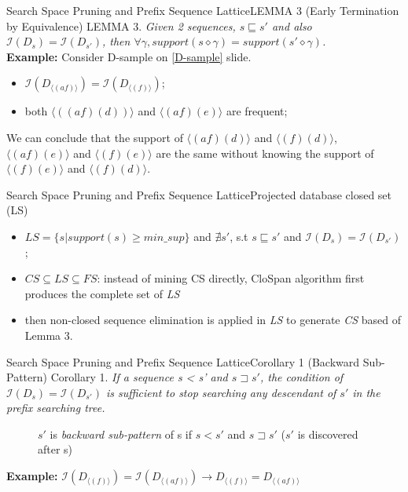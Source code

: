 \documentclass[12pt]{beamer}
\newcommand{\splitline}{\vspace{0.4cm}}
\begin{document}
\begin{frame}{Search Space Pruning and Prefix Sequence Lattice}{LEMMA 3 (Early Termination by Equivalence)}
LEMMA 3. {\it Given 2 sequences, $s \sqsubseteq s'$ and also $\mathcal{I}(D_s) = \mathcal{I}(D_{s'})$, then $\forall\gamma, support(s \diamond \gamma) = support(s' \diamond \gamma)$.}\\
\splitline
{\bf Example:} Consider D-sample on \ref{D-sample} slide.
\begin{itemize}
\item $\mathcal{I}(D_{\langle (af) \rangle}) = \mathcal{I}(D_{\langle (f) \rangle})$;
\item both $\langle ((af)(d)) \rangle$ and $\langle (af)(e) \rangle$ are frequent;
\end{itemize}
We can conclude that the support of $\langle (af)(d) \rangle$ and $\langle (f)(d) \rangle$, $\langle (af)(e) \rangle$ and $\langle (f)(e) \rangle$ are the same without knowing the support of $\langle (f)(e) \rangle$ and $\langle (f)(d) \rangle$.
\end{frame}

\begin{frame}{Search Space Pruning and Prefix Sequence Lattice}{Projected database closed set (LS)}
\begin{itemize}
\item $LS = \{s | support(s) \geq min\_sup \}$ and $\nexists s'$, s.t $s \sqsubseteq s'$ and  $\mathcal{I}(D_s) = \mathcal{I}(D_{s'})$;
\item $CS \subseteq LS \subseteq FS$: instead of mining CS directly, CloSpan algorithm first produces the complete set of {\it LS}
\item then non-closed sequence elimination is applied in  {\it LS} to generate {\it CS} based of Lemma 3.
\end{itemize}
\end{frame}

\begin{frame}{Search Space Pruning and Prefix Sequence Lattice}{Corollary 1 (Backward Sub-Pattern)}
Corollary 1. {\it If a sequence s < s' and $s \sqsupset s'$, the condition of $\mathcal{I}(D_s) = \mathcal{I}(D_{s'})$ is sufficient to stop searching any descendant of $s'$ in the prefix searching tree.}
\begin{figure}
\caption*{$s'$ is {\it backward sub-pattern} of s if $s < s'$ and $s \sqsupset s'$ ($s'$ is discovered after s)}
\end{figure}
{\bf Example:} $\mathcal{I}(D_{\langle (f) \rangle}) = \mathcal{I}(D_{\langle (af) \rangle}) \rightarrow D_{\langle (f) \rangle} = D_{\langle (af) \rangle}$
\end{frame}
\end{document}
